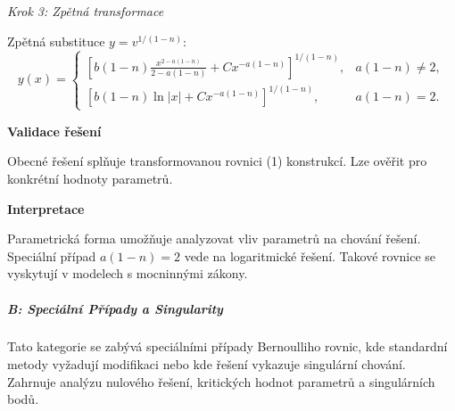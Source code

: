\begin{example}
    \vspace{1\baselineskip}
    
    \noindent\textit{Krok 3: Zpětná transformace}
    
    Zpětná substituce $y = v^{1/(1-n)}$:
    \[
    y(x) = 
    \begin{cases}
    \left[ b(1-n)\frac{x^{2-a(1-n)}}{2 - a(1-n)} + Cx^{-a(1-n)} \right]^{1/(1-n)}, & a(1-n) \neq 2, \\
    \left[ b(1-n)\ln|x| + Cx^{-a(1-n)} \right]^{1/(1-n)}, & a(1-n) = 2.
    \end{cases} \tag{3}
    \]
    
    \vspace{1.5\baselineskip}
    
    \noindent\textbf{Validace řešení}
    
    Obecné řešení splňuje transformovanou rovnici (1) konstrukcí. Lze ověřit pro konkrétní hodnoty parametrů.
    
    \vspace{1.5\baselineskip}
    
    \noindent\textbf{Interpretace}
    
    Parametrická forma umožňuje analyzovat vliv parametrů na chování řešení. Speciální případ $a(1-n) = 2$ vede na logaritmické řešení. Takové rovnice se vyskytují v modelech s mocninnými zákony.
    
    \end{example}

    \subparagraph*{B: Speciální Případy a Singularity}
\label{subpar:b-specialni-pripady}

Tato kategorie se zabývá speciálními případy Bernoulliho rovnic, kde standardní metody 
vyžadují modifikaci nebo kde řešení vykazuje singulární chování. Zahrnuje analýzu 
nulového řešení, kritických hodnot parametrů a singulárních bodů.

\vspace{1\baselineskip}

